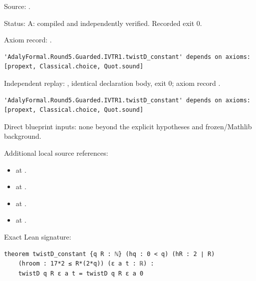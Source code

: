 \begin{theorem}[bp-049]
\par Source: \texttt{}.
\par Status: A: compiled and independently verified. Recorded exit 0.
\par Axiom record: \texttt{}.
\begin{verbatim}
'AdalyFormal.Round5.Guarded.IVTR1.twistD_constant' depends on axioms: [propext, Classical.choice, Quot.sound]
\end{verbatim}
\par Independent replay: \texttt{}, identical declaration body, exit 0; axiom record \texttt{}.
\begin{verbatim}
'AdalyFormal.Round5.Guarded.IVTR1.twistD_constant' depends on axioms: [propext, Classical.choice, Quot.sound]
\end{verbatim}
\par Direct blueprint inputs: none beyond the explicit hypotheses and frozen/Mathlib background.
\par Additional local source references:
\begin{itemize}
\item \texttt{} at \texttt{}.
\item \texttt{} at \texttt{}.
\item \texttt{} at \texttt{}.
\item \texttt{} at \texttt{}.
\end{itemize}
\par Exact Lean signature:
\begin{verbatim}
theorem twistD_constant {q R : ℕ} (hq : 0 < q) (hR : 2 ∣ R)
    (hroom : 17*2 ≤ R*(2*q)) (ε a t : ℝ) :
    twistD q R ε a t = twistD q R ε a 0
\end{verbatim}
\end{theorem}

